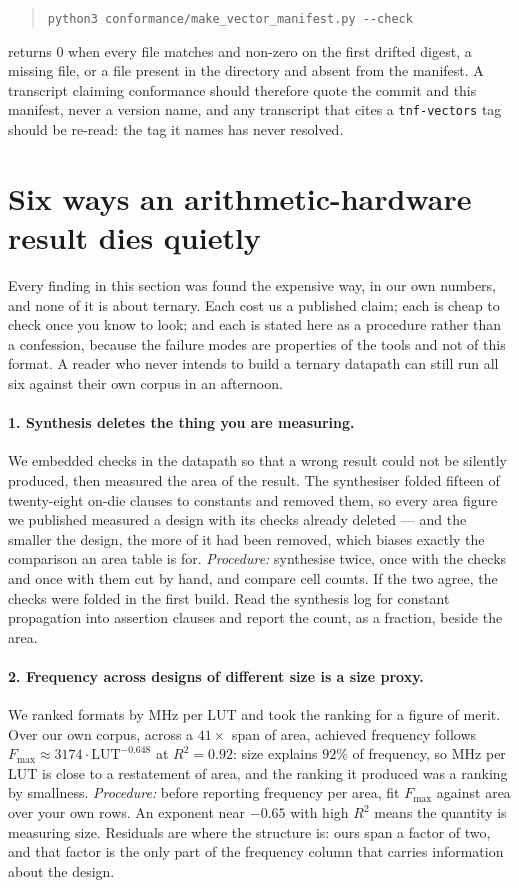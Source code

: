 \documentclass[11pt]{article}
\theoremstyle{definition}
\begin{document}
\begin{quote}
\texttt{python3 conformance/make\_vector\_manifest.py -{}-check}
\end{quote}

\noindent returns $0$ when every file matches and non-zero on the first drifted
digest, a missing file, or a file present in the directory and absent from the
manifest. A transcript claiming conformance should therefore quote the commit
and this manifest, never a version name, and any transcript that cites a
\texttt{tnf-vectors} tag should be re-read: the tag it names has never
resolved.

\section{Six ways an arithmetic-hardware result dies quietly}\label{sec:checklist}

Every finding in this section was found the expensive way, in our own numbers,
and none of it is about ternary. Each cost us a published claim; each is cheap to
check once you know to look; and each is stated here as a procedure rather than a
confession, because the failure modes are properties of the tools and not of this
format. A reader who never intends to build a ternary datapath can still run all
six against their own corpus in an afternoon.

\paragraph{1. Synthesis deletes the thing you are measuring.} We embedded checks
in the datapath so that a wrong result could not be silently produced, then
measured the area of the result. The synthesiser folded fifteen of twenty-eight
on-die clauses to constants and removed them, so every area figure we published
measured a design with its checks already deleted --- and the smaller the design,
the more of it had been removed, which biases exactly the comparison an area
table is for.
\emph{Procedure:} synthesise twice, once with the checks and once with them cut
by hand, and compare cell counts. If the two agree, the checks were folded in the
first build. Read the synthesis log for constant propagation into assertion
clauses and report the count, as a fraction, beside the area.

\paragraph{2. Frequency across designs of different size is a size proxy.} We
ranked formats by MHz per LUT and took the ranking for a figure of merit. Over
our own corpus, across a $41\times$ span of area, achieved frequency follows
$F_{\max}\approx 3174\cdot\mathrm{LUT}^{-0.648}$ at $R^2=0.92$: size explains
$92\%$ of frequency, so MHz per LUT is close to a restatement of area, and the
ranking it produced was a ranking by smallness.
\emph{Procedure:} before reporting frequency per area, fit $F_{\max}$ against
area over your own rows. An exponent near $-0.65$ with high $R^2$ means the
quantity is measuring size. Residuals are where the structure is: ours span a
factor of two, and that factor is the only part of the frequency column that
carries information about the design.
\end{document}
